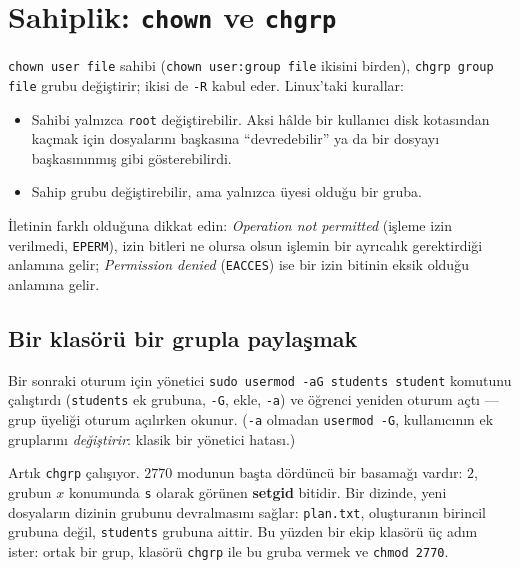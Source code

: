 \documentclass[11pt,a4paper]{article}
\newcommand{\term}[1]{\textbf{\color{mintdeep}#1}}
\newcommand{\cmd}[1]{\texttt{#1}}
\begin{document}
\section{Sahiplik: \cmd{chown} ve \cmd{chgrp}}
\label{sec:own}

\cmd{chown user file} sahibi (\cmd{chown user:group file} ikisini birden), \cmd{chgrp group file} grubu değiştirir; ikisi de \texttt{-R} kabul eder. Linux'taki kurallar:
\begin{itemize}
  \item Sahibi yalnızca \texttt{root} değiştirebilir. Aksi hâlde bir kullanıcı disk kotasından kaçmak için dosyalarını başkasına ``devredebilir'' ya da bir dosyayı başkasınınmış gibi gösterebilirdi.
  \item Sahip grubu değiştirebilir, ama yalnızca üyesi olduğu bir gruba.
\end{itemize}



İletinin farklı olduğuna dikkat edin: \emph{Operation not permitted} (işleme izin verilmedi, \texttt{EPERM}), izin bitleri ne olursa olsun işlemin bir ayrıcalık gerektirdiği anlamına gelir; \emph{Permission denied} (\texttt{EACCES}) ise bir izin bitinin eksik olduğu anlamına gelir.

\subsection{Bir klasörü bir grupla paylaşmak}

Bir sonraki oturum için yönetici \cmd{sudo usermod -aG students student} komutunu çalıştırdı (\texttt{students} ek grubuna, \texttt{-G}, ekle, \texttt{-a}) ve öğrenci yeniden oturum açtı --- grup üyeliği oturum açılırken okunur. (\texttt{-a} olmadan \cmd{usermod -G}, kullanıcının ek gruplarını \emph{değiştirir}: klasik bir yönetici hatası.)



Artık \cmd{chgrp} çalışıyor. $2770$ modunun başta dördüncü bir basamağı vardır: $2$, grubun $x$ konumunda \texttt{s} olarak görünen \term{setgid} bitidir. Bir dizinde, yeni dosyaların dizinin grubunu devralmasını sağlar: \texttt{plan.txt}, oluşturanın birincil grubuna değil, \texttt{students} grubuna aittir. Bu yüzden bir ekip klasörü üç adım ister: ortak bir grup, klasörü \cmd{chgrp} ile bu gruba vermek ve \cmd{chmod 2770}.
\end{document}
